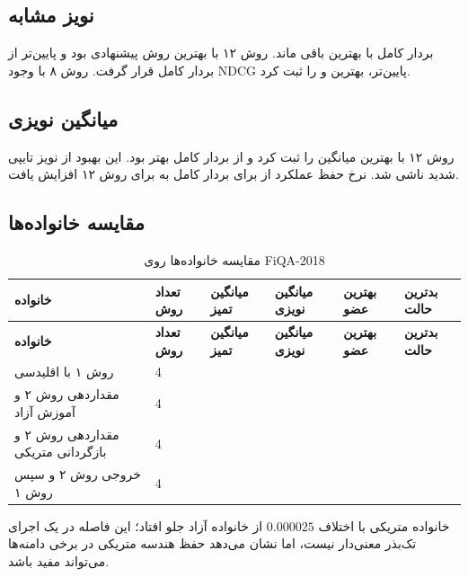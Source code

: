 \documentclass[a4paper,12pt]{article}
\makeatletter
\newcommand{\MRR}{\lr{MRR@10}}
\makeatother
\begin{document}
\subsection{نویز مشابه }
بردار کامل با  بهترین باقی ماند. روش ۱۲ با  بهترین روش پیشنهادی بود و  پایین‌تر از بردار کامل قرار گرفت. روش ۸ با وجود NDCG پایین‌تر، بهترین \MRR و  را ثبت کرد.

\subsection{میانگین نویزی}
روش ۱۲ با  بهترین میانگین را ثبت کرد و  از بردار کامل بهتر بود. این بهبود از نویز تایپی شدید ناشی شد. نرخ حفظ عملکرد از  برای بردار کامل به  برای روش ۱۲ افزایش یافت.

\subsection{مقایسه خانواده‌ها}
\scriptsize
\begin{longtable}{|C{5cm}|C{2cm}|C{2.4cm}|C{2.4cm}|C{2.4cm}|C{2.4cm}|}
\caption{مقایسه خانواده‌ها روی FiQA-2018}\label{tab:fiqa-family}\\
\hline
\textbf{خانواده} & \textbf{تعداد روش} & \textbf{میانگین تمیز} & \textbf{میانگین نویزی} & \textbf{بهترین عضو} & \textbf{بدترین حالت} \\
\hline
\endfirsthead
\hline
\textbf{خانواده} & \textbf{تعداد روش} & \textbf{میانگین تمیز} & \textbf{میانگین نویزی} & \textbf{بهترین عضو} & \textbf{بدترین حالت} \\
\hline
\endhead
روش ۱ با  اقلیدسی & 4 &  &  &  &  \\
\hline
مقداردهی روش ۲ و آموزش آزاد & 4 &  &  &  &  \\
\hline
مقداردهی روش ۲ و بازگردانی متریکی & 4 &  &  &  &  \\
\hline
{} خروجی روش ۲ و سپس روش ۱ & 4 &  &  &  &  \\
\hline
\end{longtable}
خانواده متریکی با اختلاف $0.000025$ از خانواده آزاد جلو افتاد؛ این فاصله در یک اجرای تک‌بذر معنی‌دار نیست، اما نشان می‌دهد حفظ هندسه متریکی در برخی دامنه‌ها می‌تواند مفید باشد.
\end{document}
